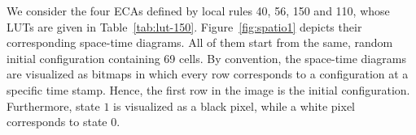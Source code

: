 \begin{example}
	We consider the four ECAs defined by local rules 40, 56, 150 and 110, whose LUTs are given in Table~\ref{tab:lut-150}. 
	Figure~\ref{fig:spatio1} depicts their corresponding space-time diagrams. All of them start from the same, random initial configuration containing 69 cells. By convention, the space-time diagrams are visualized as bitmaps in which every row corresponds to a configuration at a specific time stamp. Hence, the first row in the image is the initial configuration. Furthermore, state $1$ is visualized as a black pixel, while a white pixel corresponds to state $0$.

	\begin{figure}
		\centering
		\
		\\
		\

\end{figure}
\end{example}
